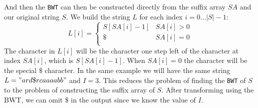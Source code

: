 \documentclass{article}
\begin{document}
And then the \texttt{BWT} can then be constructed directly from the suffix array \(SA\) and our original string \(S\). We build the string \(L\) for each index \(i = 0 \dots |S|-1\):
\[
    L[i] = \begin{cases} 
        S[SA[i] - 1] & SA[i] > 0 \\
        \$ & SA[i] = 0 \\
   \end{cases}
\]
The character in \(L[i]\) will be the character one step left of the character at index \(SA[i]\), which is \(S[SA[i] - 1]\). When \(SA[i] = 0\) the character will be the special \(\$\) character. In the same example we will have the same string \(L = "ard\$rcaaaabb"\) and \(I = 3\).
This reduces the problem of finding the \texttt{BWT} of \(S\) to the problem of constructing the suffix array of \(S\). After transforming using the BWT, we can omit \(\$\) in the output since we know the value of \(I\).
\end{document}
